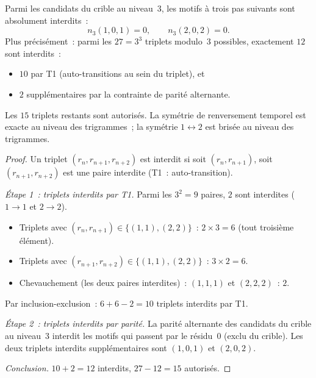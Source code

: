 \documentclass[12pt,a4paper]{article}
\begin{document}
\mTHM
\begin{theoreme}
\label{thm:T1_3gram}
Parmi les candidats du crible au niveau~3, les motifs à trois pas
suivants sont absolument interdits~:
\begin{equation}
  n_3(1,0,1) = 0, \qquad n_3(2,0,2) = 0.
  \label{eq:T1_3gram}
\end{equation}
Plus précisément~: parmi les $27 = 3^3$ triplets modulo~3 possibles,
exactement $12$ sont interdits~:
\begin{itemize}
\item $10$ par T1 (auto-transitions au sein du triplet), et
\item $2$ supplémentaires par la contrainte de parité alternante.
\end{itemize}
Les $15$ triplets restants sont autorisés. La symétrie de renversement
temporel est exacte au niveau des trigrammes~; la symétrie
$1 \leftrightarrow 2$ est brisée au niveau des trigrammes.
\end{theoreme}

\begin{proof}
Un triplet $(r_n, r_{n+1}, r_{n+2})$ est interdit si soit
$(r_n, r_{n+1})$, soit $(r_{n+1}, r_{n+2})$ est une paire interdite
(T1~: auto-transition).

\emph{Étape 1~: triplets interdits par T1.}
Parmi les $3^2 = 9$ paires, $2$ sont interdites ($1\to1$ et $2\to2$).
\begin{itemize}[nosep]
\item Triplets avec $(r_n, r_{n+1}) \in \{(1,1),(2,2)\}$~:
  $2 \times 3 = 6$ (tout troisième élément).
\item Triplets avec $(r_{n+1}, r_{n+2}) \in \{(1,1),(2,2)\}$~:
  $3 \times 2 = 6$.
\item Chevauchement (les deux paires interdites)~: $(1,1,1)$ et
  $(2,2,2)$~: $2$.
\end{itemize}
Par inclusion-exclusion~: $6 + 6 - 2 = 10$ triplets interdits par T1.

\emph{Étape 2~: triplets interdits par parité.}
La parité alternante des candidats du crible au niveau~3 interdit les
motifs qui passent par le résidu~0 (exclu du crible). Les deux
triplets interdits supplémentaires sont $(1,0,1)$ et $(2,0,2)$.

\emph{Conclusion.}
$10 + 2 = 12$ interdits, $27 - 12 = 15$ autorisés.
\end{proof}

\end{document}
